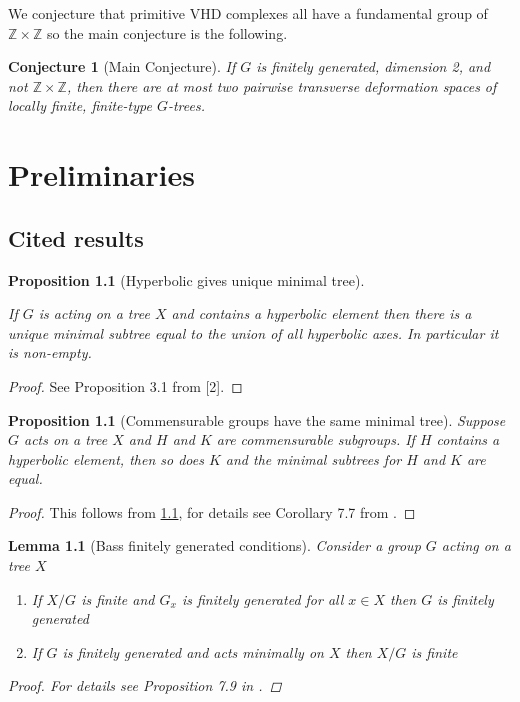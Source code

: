 \documentclass[12pt,parskip=full]{report}
\theoremstyle{plain}
\newtheorem{lem}[thm]{Lemma}
\newtheorem{prop}[thm]{Proposition}
\newtheorem{conj}[thm]{Conjecture}
\theoremstyle{definition}
\begin{document}
% 

We conjecture that primitive VHD complexes all have a fundamental group of \(\mathbb{Z}\times \mathbb{Z}\) so the main conjecture is the following.

\begin{conj}
    [Main Conjecture]
    If \(G\) is finitely generated, dimension 2, and not \(\mathbb{Z}\times \mathbb{Z}\), then there are at most two pairwise transverse deformation spaces of locally finite, finite-type \(G\)-trees.
\end{conj}

\chapter{Preliminaries}
\section{Cited results}

\begin{prop}
    [Hyperbolic gives unique minimal tree]
    \label{pro:uniquemintree}
    
    If $G$ is acting on a tree $X$ and contains a hyperbolic element then there is a unique minimal subtree equal to the union of all hyperbolic axes. In particular it is non-empty.
\end{prop}
\begin{proof}
See Proposition 3.1 from [2].
\end{proof}
\begin{prop}
    [Commensurable groups have the same minimal tree]
    \label{pro:commintree}
    Suppose $G$ acts on a tree $X$ and $H$ and $K$ are commensurable subgroups. If $H$ contains a hyperbolic element, then so does $K$ and the minimal subtrees for $H$ and $K$ are equal.
\end{prop}
\begin{proof}
    This follows from \ref{pro:uniquemintree}, for details see Corollary 7.7 from \cite{hymanbass}.
\end{proof}


\begin{lem}
    [Bass finitely generated conditions]
    \label{lem:bassfgcon}
    Consider a group \(G\) acting on a tree \(X\)
    \begin{enumerate}
        \item If \(X/G\) is finite and \(G_x\) is finitely generated for all \(x\in X\) then \(G\) is finitely generated
        \item If \(G\) is finitely generated and acts minimally on \(X\) then \(X/G\) is finite
    \end{enumerate}
    \begin{proof}
        For details see Proposition 7.9 in \cite{hymanbass}.
    \end{proof}
\end{lem}
\end{document}
